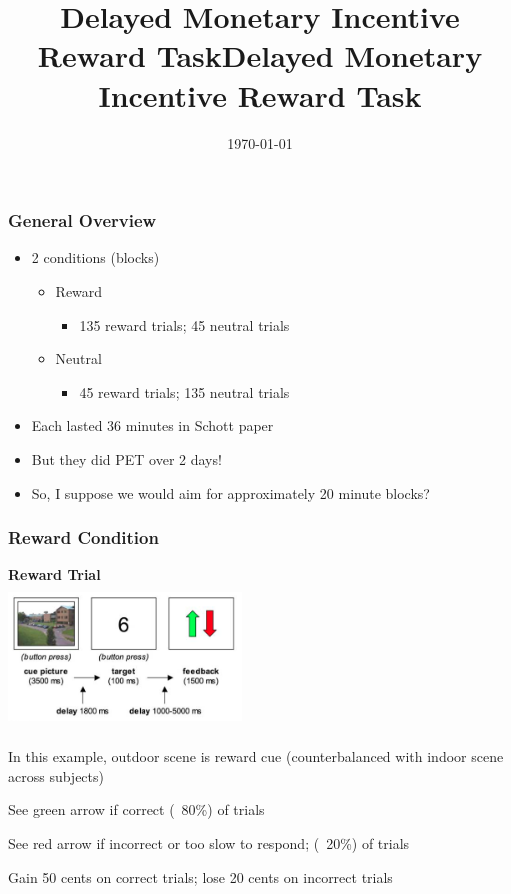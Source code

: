 \documentclass{beamer}
\title{Delayed Monetary Incentive Reward Task}
\date{\today}
\title[{\makebox[.953\paperwidth]{Delayed Monetary Incentive Reward Task\hfill%
\insertframenumber/\inserttotalframenumber}}]{Delayed Monetary Incentive Reward Task}
\begin{document}
\begin{frame}
\titlepage
\end{frame}

\begin{frame}
\frametitle{General Overview}
	\begin{itemize}
		\item 2 conditions (blocks)
			\begin{itemize}
				\item Reward
					\begin{itemize}
						\item 135 reward trials; 45 neutral trials
					\end{itemize}
				\item Neutral
					\begin{itemize}
						\item 45 reward trials; 135 neutral trials
					\end{itemize}
			\end{itemize}
		\item Each lasted 36 minutes in Schott paper
		\item But they did PET over 2 days!
		\item So, I suppose we would aim for approximately 20 minute blocks?
	\end{itemize}
\end{frame}

\begin{frame}
\frametitle{Reward Condition}
\begin{center}
\bf{Reward Trial} \\
	\includegraphics[height=38mm,width=62mm]{rewardcond} \\
	\begin{itemize}
		\footnotesize{
		\item In this example, outdoor scene is reward cue (counterbalanced with indoor scene across subjects)
		\item See green arrow if correct (~80\%) of trials 
		\item See red arrow if incorrect or too slow to respond; (~20\%) of trials 
		\item Gain 50 cents on correct trials; lose 20 cents on incorrect trials}
	\end{itemize}
\end{center}
\end{frame}
\end{document}
